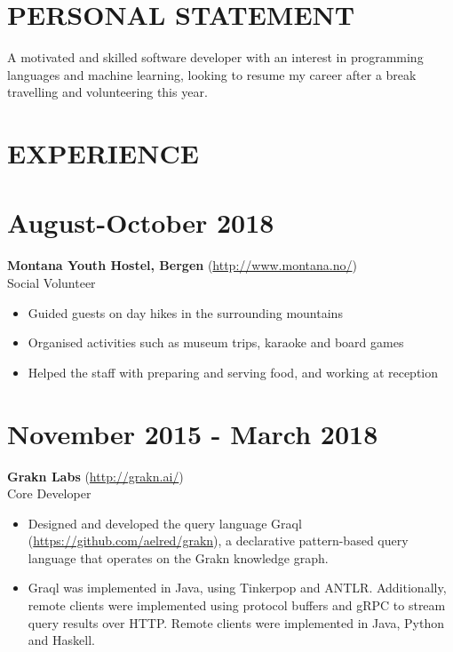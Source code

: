 \documentclass[margin]{res}
\begin{document}
\begin{resume}

\section{PERSONAL STATEMENT}

A motivated and skilled software developer with an interest in programming languages and machine learning, looking to resume my career after a break travelling and volunteering this year.

\section{EXPERIENCE}

\normalsize{\section{August-October 2018}}
{\bf Montana Youth Hostel, Bergen} (\href{http://www.montana.no/}{http://www.montana.no/}) \\
Social Volunteer \\
\begin{itemize}
\item
Guided guests on day hikes in the surrounding mountains
\item
Organised activities such as museum trips, karaoke and board games
\item
Helped the staff with preparing and serving food, and working at reception
\end{itemize}

\normalsize{\section{November 2015 - March 2018}}
{\bf Grakn Labs} (\href{http://grakn.ai/}{http://grakn.ai/}) \\
Core Developer \\
\begin{itemize}

\item
Designed and developed the query language Graql (\href{https://github.com/aelred/grakn}{https://github.com/aelred/grakn}), a declarative pattern-based query language that operates on the Grakn knowledge graph.

\item
Graql was implemented in Java, using Tinkerpop and ANTLR. Additionally, remote clients were implemented using protocol buffers and gRPC to stream query results over HTTP. Remote clients were implemented in Java, Python and Haskell.


\end{itemize}
\end{resume}
\end{document}
